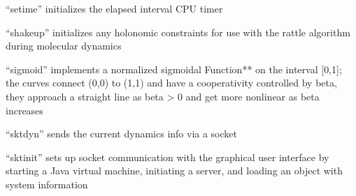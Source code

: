 \documentclass[letterpaper,11pt,english]{sphinxmanual}
\begin{document}










“setime” initializes the elapsed interval CPU timer











“shakeup” initializes any holonomic constraints for use with the rattle algorithm during molecular dynamics


“sigmoid” implements a normalized sigmoidal Function** on the interval {[}0,1{]}; the curves connect (0,0) to (1,1) and have a cooperativity controlled by beta, they approach a straight line as beta \sphinxhyphen{}\textgreater{} 0 and get more nonlinear as beta increases


“sktdyn” sends the current dynamics info via a socket


“sktinit” sets up socket communication with the graphical user interface by starting a Java virtual machine, initiating a server, and loading an object with system information
\end{document}
